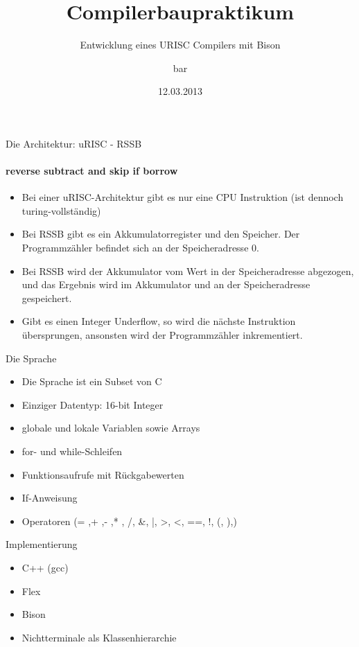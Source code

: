 \documentclass{beamer}
\title{Compilerbaupraktikum}
\subtitle{Entwicklung eines URISC Compilers mit Bison}
\author[foo]{bar}
\institute[IPS]{Institute for Programming and Reactive Systems}
\date{12.03.2013}
\begin{document}
\frame[plain]{\titlepage}


\begin{frame}{Die Architektur: uRISC - RSSB}
\framesubtitle{reverse subtract and skip if borrow}
\begin{itemize}
	\item Bei einer uRISC-Architektur gibt es nur eine CPU Instruktion (ist dennoch turing-vollständig)
	\item Bei RSSB gibt es ein Akkumulatorregister und den Speicher. Der Programmzähler befindet sich an der Speicheradresse 0. 
	\item Bei RSSB wird der Akkumulator vom Wert in der Speicheradresse abgezogen, und das Ergebnis wird im Akkumulator und an der Speicheradresse gespeichert.
	\item Gibt es einen Integer Underflow, so wird die nächste Instruktion übersprungen, ansonsten wird der Programmzähler inkrementiert.
\end{itemize}
\end{frame}

\begin{frame}{Die Sprache}
\begin{itemize}
	\item Die Sprache ist ein Subset von C
	\item Einziger Datentyp: 16-bit Integer
	\item globale und lokale Variablen sowie Arrays
	\item for- und while-Schleifen
	\item Funktionsaufrufe mit Rückgabewerten
	\item If-Anweisung
	\item Operatoren (= ,+ ,- ,* , /, \&, |,  >, <, ==, !, (, ),)
\end{itemize}
\end{frame}

\begin{frame}{Implementierung}
\begin{itemize}
	\item C++ (gcc)
	\item Flex
	\item Bison
	\item Nichtterminale als Klassenhierarchie
\end{itemize}
\end{frame}
\end{document}
